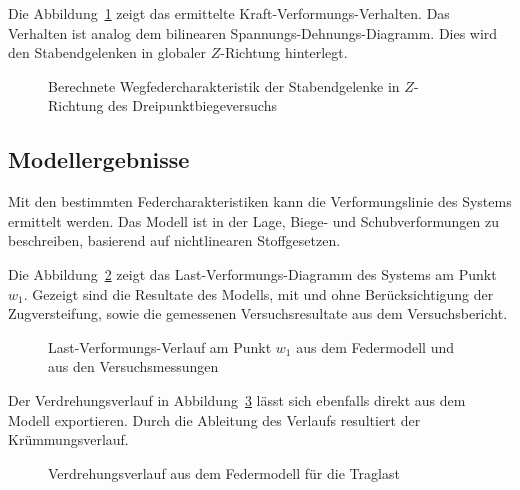 \documentclass[
  11pt,
  letterpaper,
]{scrreprt}
\begin{document}
Die Abbildung~\ref{fig-wegfeder-schub-a3v2} zeigt das ermittelte
Kraft-Verformungs-Verhalten. Das Verhalten ist analog dem bilinearen
Spannungs-Dehnungs-Diagramm. Dies wird den Stabendgelenken in globaler
\(Z\)-Richtung hinterlegt.

\begin{figure}[H]


\caption{\label{fig-wegfeder-schub-a3v2}Berechnete
Wegfedercharakteristik der Stabendgelenke in \(Z\)-Richtung des
Dreipunktbiegeversuchs}

\end{figure}%

\subsection{Modellergebnisse}\label{modellergebnisse}

Mit den bestimmten Federcharakteristiken kann die Verformungslinie des
Systems ermittelt werden. Das Modell ist in der Lage, Biege- und
Schubverformungen zu beschreiben, basierend auf nichtlinearen
Stoffgesetzen.

Die Abbildung~\ref{fig-fwa3v2} zeigt das Last-Verformungs-Diagramm des
Systems am Punkt \(w_1\). Gezeigt sind die Resultate des Modells, mit
und ohne Berücksichtigung der Zugversteifung, sowie die gemessenen
Versuchsresultate aus dem Versuchsbericht.

\begin{figure}[H]


\caption{\label{fig-fwa3v2}Last-Verformungs-Verlauf am Punkt \(w_1\) aus
dem Federmodell und aus den Versuchsmessungen}

\end{figure}%

Der Verdrehungsverlauf in Abbildung~\ref{fig-phi-max-a3v2} lässt sich
ebenfalls direkt aus dem Modell exportieren. Durch die Ableitung des
Verlaufs resultiert der Krümmungsverlauf.

\begin{figure}[H]


\caption{\label{fig-phi-max-a3v2}Verdrehungsverlauf aus dem Federmodell
für die Traglast}

\end{figure}%
\end{document}
